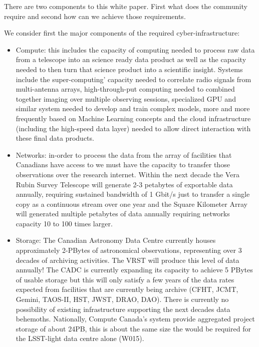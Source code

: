\documentclass[11pt]{article}
\begin{document}
There are two components to this white paper.  First what does the community require and second how can we achieve those requirements. 

We consider first the major components of the required cyber-infrastructure:
\begin{itemize}
    \item Compute: this includes the capacity of computing needed to process raw data from a telescope into an science ready data product as well as the capacity needed to then turn that science product into a scientific insight.  Systems include the super-computing' capacity needed to correlate radio signals from multi-antenna arrays, high-through-put computing needed to combined together imaging over multiple observing sessions, specialized GPU and similar system needed to develop and train complex models, more and more frequently based on Machine Learning concepts and the cloud infrastructure (including the high-speed data layer) needed to allow direct interaction with these final data products.
    \item Networks: in-order to process the data from the array of facilities that Canadians have access to we must have the capacity to transfer those observations over the research internet.  Within the next decade the Vera Rubin Survey Telescope will generate 2-3 petabytes of exportable data annually, requiring sustained bandwidth of 1 Gbit/s just to transfer a single copy as a continuous stream over one year and the Square Kilometer Array will generated multiple petabytes of data annually requiring networks capacity 10 to 100 times larger.  
    
    \item Storage: The Canadian Astronomy Data Centre currently houses approximately 2-PBytes of astronomical observations, representing over 3 decades of archiving activities.  The VRST will produce this level of data annually!  The CADC is currently expanding its capacity to achieve 5 PBytes of usable storage but  this will only satisfy a few years of the data rates expected from facilities that are currently being archive (CFHT, JCMT, Gemini, TAOS-II, HST, JWST, DRAO, DAO).  There is currently no possibility of existing infrastructure supporting the next decades data behemoths. 
    Nationally, Compute Canada's system provide aggregated project storage of about 24PB, this is about the same size the would be required for the LSST-light data centre alone (W015).
    

\end{itemize}
\end{document}
